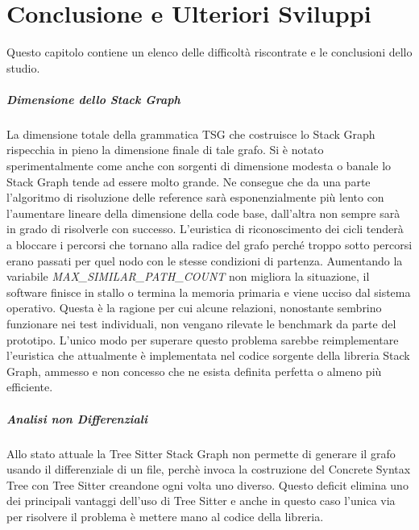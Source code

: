 \chapter{Conclusione e Ulteriori Sviluppi}

Questo capitolo contiene un elenco delle difficolt\`a riscontrate e le conclusioni dello studio.

\paragraph{Dimensione dello Stack Graph}

La dimensione totale della grammatica TSG che costruisce lo Stack Graph rispecchia in pieno la dimensione finale di tale grafo. Si \`e notato sperimentalmente come anche con sorgenti di dimensione modesta o banale lo Stack Graph tende ad essere molto grande. Ne consegue che da una parte l'algoritmo di risoluzione delle reference sar\`a esponenzialmente pi\`u lento con l'aumentare lineare della dimensione della code base, dall'altra non sempre sar\`a in grado di risolverle con successo. L'euristica di riconoscimento dei cicli tender\`a a bloccare i percorsi che tornano alla radice del grafo perch\'e troppo sotto percorsi erano passati per quel nodo con le stesse condizioni di partenza. Aumentando la variabile \emph{MAX\_SIMILAR\_PATH\_COUNT} non migliora la situazione, il software finisce in stallo o termina la memoria primaria e viene ucciso dal sistema operativo. Questa \`e la ragione per cui alcune relazioni, nonostante sembrino funzionare nei test individuali, non vengano rilevate le benchmark da parte del prototipo. L'unico modo per superare questo problema sarebbe reimplementare l'euristica che attualmente \`e implementata nel codice sorgente della libreria Stack Graph, ammesso e non concesso che ne esista definita perfetta o almeno pi\`u efficiente.

\paragraph{Analisi non Differenziali}

Allo stato attuale la Tree Sitter Stack Graph non permette di generare il grafo usando il differenziale di un file, perch\`e invoca la costruzione del Concrete Syntax Tree con Tree Sitter creandone ogni volta uno diverso. Questo deficit elimina uno dei principali vantaggi dell'uso di Tree Sitter e anche in questo caso l'unica via per risolvere il problema \`e mettere mano al codice della libreria.

